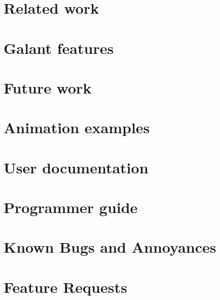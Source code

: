 \documentclass{article}
\begin{document}


\section{Related work}



\section{Galant features}\label{sec:galant_features}





\section{Future work}







\clearpage

\appendix

\section{Animation examples}
\label{sec:animations}


\clearpage

\section{User documentation}
\label{sec:user_documentation}


\clearpage

\section{Programmer guide}
\label{sec:programmer_guide}


\clearpage

\section{Known Bugs and Annoyances}
\label{sec:bugs}


\clearpage

\section{Feature Requests}
\label{sec:enhancements}


\end{document}
